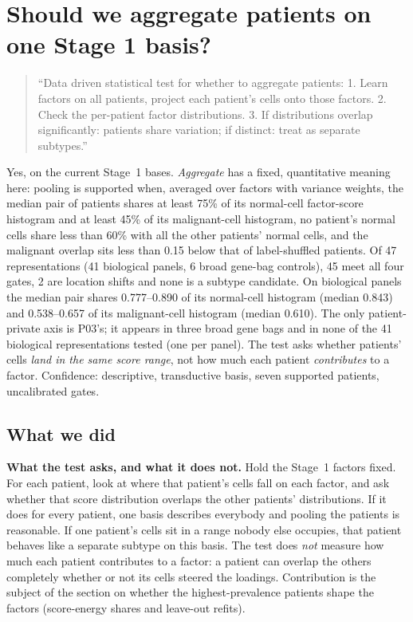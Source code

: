 \section{Should we aggregate patients on one Stage 1 basis?}
\label{sec:03_aggregate}

\begin{quote}
``Data driven statistical test for whether to aggregate patients: 1. Learn factors on all patients, project each patient's cells onto those factors. 2. Check the per-patient factor distributions. 3. If distributions overlap significantly: patients share variation; if distinct: treat as separate subtypes.''
\end{quote}

\begin{answerbox}
Yes, on the current Stage~1 bases. \emph{Aggregate} has a fixed, quantitative meaning here: pooling is supported when, averaged over factors with variance weights, the median pair of patients shares at least 75\% of its normal-cell factor-score histogram and at least 45\% of its malignant-cell histogram, no patient's normal cells share less than 60\% with all the other patients' normal cells, and the malignant overlap sits less than 0.15 below that of label-shuffled patients. Of 47 representations (41 biological panels, 6 broad gene-bag controls), 45 meet all four gates, 2 are location shifts and none is a subtype candidate. On biological panels the median pair shares 0.777--0.890 of its normal-cell histogram (median 0.843) and 0.538--0.657 of its malignant-cell histogram (median 0.610). The only patient-private axis is P03's; it appears in three broad gene bags and in none of the 41 biological representations tested (one per panel). The test asks whether patients' cells \emph{land in the same score range}, not how much each patient \emph{contributes} to a factor. Confidence: descriptive, transductive basis, seven supported patients, uncalibrated gates.
\end{answerbox}

\subsection*{What we did}

\textbf{What the test asks, and what it does not.} Hold the Stage~1 factors fixed. For each patient, look at where that patient's cells fall on each factor, and ask whether that score distribution overlaps the other patients' distributions. If it does for every patient, one basis describes everybody and pooling the patients is reasonable. If one patient's cells sit in a range nobody else occupies, that patient behaves like a separate subtype on this basis. The test does \emph{not} measure how much each patient contributes to a factor: a patient can overlap the others completely whether or not its cells steered the loadings. Contribution is the subject of the section on whether the highest-prevalence patients shape the factors (score-energy shares and leave-out refits).

